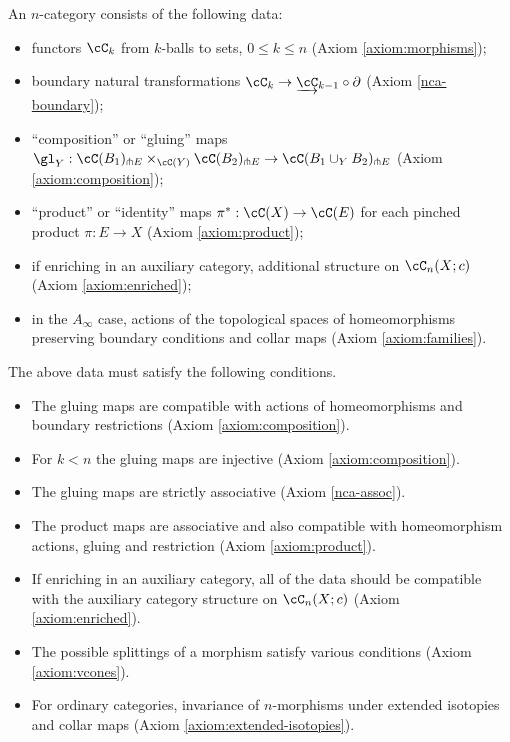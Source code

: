 An $n$-category consists of the following data:
\begin{itemize}
\item functors $\cC_k$ from $k$-balls to sets, $0\le k\le n$ (Axiom \ref{axiom:morphisms});
\item boundary natural transformations $\cC_k \to \cl{\cC}_{k-1} \circ \bd$ (Axiom \ref{nca-boundary});
\item ``composition'' or ``gluing'' maps $\gl_Y : \cC(B_1)\trans E \times_{\cC(Y)} \cC(B_2)\trans E \to \cC(B_1\cup_Y B_2)\trans E$ (Axiom \ref{axiom:composition});
\item ``product'' or ``identity'' maps $\pi^*:\cC(X)\to \cC(E)$ for each pinched product $\pi:E\to X$ (Axiom \ref{axiom:product});
\item if enriching in an auxiliary category, additional structure on $\cC_n(X; c)$ (Axiom \ref{axiom:enriched});
\item in the $A_\infty$ case, actions of the topological spaces of homeomorphisms preserving boundary conditions
and collar maps (Axiom \ref{axiom:families}).
\end{itemize}
The above data must satisfy the following conditions.
\begin{itemize}
\item The gluing maps are compatible with actions of homeomorphisms and boundary 
restrictions (Axiom \ref{axiom:composition}).
\item For $k<n$ the gluing maps are injective (Axiom \ref{axiom:composition}).
\item The gluing maps are strictly associative (Axiom \ref{nca-assoc}).
\item The product maps are associative and also compatible with homeomorphism actions, gluing and restriction (Axiom \ref{axiom:product}).
\item If enriching in an auxiliary category, all of the data should be compatible 
with the auxiliary category structure on $\cC_n(X; c)$ (Axiom \ref{axiom:enriched}).
\item The possible splittings of a morphism satisfy various conditions (Axiom \ref{axiom:vcones}).
\item For ordinary categories, invariance of $n$-morphisms under extended isotopies 
and collar maps (Axiom \ref{axiom:extended-isotopies}).
\end{itemize}


